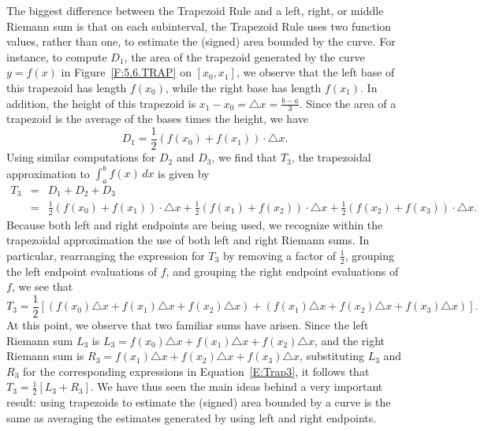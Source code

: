 The biggest difference between the Trapezoid Rule and a left, right, or middle Riemann sum is that on each subinterval, the Trapezoid Rule uses two function values, rather than one, to estimate the (signed) area bounded by the curve.  For instance, to compute $D_1$, the area of the trapezoid generated by the curve $y = f(x)$ in Figure~\ref{F:5.6.TRAP} on $[x_0, x_1]$, we observe that the left base of this trapezoid has length $f(x_0)$, while the right base has length $f(x_1)$.  In addition, the height of this trapezoid is $x_1 - x_0 = \triangle x = \frac{b-a}{3}$.  Since the area of a trapezoid is the average of the bases times the height, we have
$$D_1 = \frac{1}{2}(f(x_0) + f(x_1)) \cdot \triangle x.$$
Using similar computations for $D_2$ and $D_3$, we find that $T_3$, the trapezoidal approximation to $\int_a^b f(x) \, dx$ is given by 
\begin{eqnarray*}
T_3 & = & D_1 + D_2 + D_3 \\
	& =  & \frac{1}{2}(f(x_0) + f(x_1)) \cdot \triangle x + \frac{1}{2}(f(x_1) + f(x_2)) \cdot \triangle x + \frac{1}{2}(f(x_2) + f(x_3)) \cdot \triangle x.
\end{eqnarray*}
Because both left and right endpoints are being used, we recognize within the trapezoidal approximation the use of both left and right Riemann sums.  In particular, rearranging the expression for $T_3$ by removing a factor of $\frac{1}{2}$,  grouping the left endpoint evaluations of $f$, and  grouping the right endpoint evaluations of $f$, we see that
\begingroup
\small
\begin{equation} \label{E:Trap3}
T_3 =  \frac{1}{2} \left[ (f(x_0) \triangle x + f(x_1) \triangle x + f(x_2) \triangle x)  + (f(x_1) \triangle x + f(x_2) \triangle x + f(x_3) \triangle x) \right].
\end{equation}
\endgroup
At this point, we observe that two familiar sums have arisen.  Since the left Riemann sum $L_3$ is $L_3 = f(x_0) \triangle x + f(x_1) \triangle x + f(x_2) \triangle x$, and the right Riemann sum is $R_3 = f(x_1) \triangle x + f(x_2) \triangle x + f(x_3) \triangle x$, substituting $L_3$ and $R_3$ for the corresponding expressions in Equation~\ref{E:Trap3}, it follows that $T_3 = \frac{1}{2} \left[ L_3 + R_3 \right].$
We have thus seen the main ideas behind a very important result:  using trapezoids to estimate the (signed) area bounded by a curve is the same as averaging the estimates generated by using left and right endpoints.
\vspace*{5pt}

